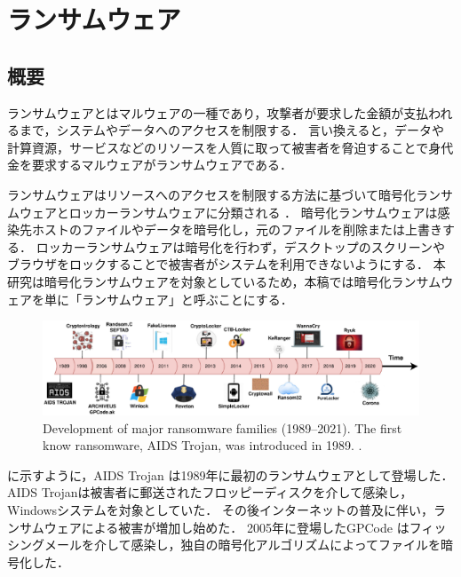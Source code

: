 \chapter{ランサムウェア}





\section{概要}
\label{sec:ransom-overview}
ランサムウェアとはマルウェアの一種であり，攻撃者が要求した金額が支払われるまで，システムやデータへのアクセスを制限する．
言い換えると，データや計算資源，サービスなどのリソースを人質に取って被害者を脅迫することで身代金を要求するマルウェアがランサムウェアである．

ランサムウェアはリソースへのアクセスを制限する方法に基づいて暗号化ランサムウェアとロッカーランサムウェアに分類される \cite{oz2022survey}．
暗号化ランサムウェアは感染先ホストのファイルやデータを暗号化し，元のファイルを削除または上書きする．
ロッカーランサムウェアは暗号化を行わず，デスクトップのスクリーンやブラウザをロックすることで被害者がシステムを利用できないようにする．
本研究は暗号化ランサムウェアを対象としているため，本稿では暗号化ランサムウェアを単に「ランサムウェア」と呼ぶことにする．

\begin{figure}[t]
  \begin{center}
    \includegraphics[width=\columnwidth]{doc/img/ransom-evolution.eps}
  \end{center}
  \caption{Development of major ransomware families (1989–2021). The first know ransomware, AIDS Trojan, was introduced in 1989. \cite{Evolution-Ransomware}.}
  \label{fig:ransom-evolution}
\end{figure}

に示すように，AIDS Trojan \cite{aids-trojan} は1989年に最初のランサムウェアとして登場した．
AIDS Trojanは被害者に郵送されたフロッピーディスクを介して感染し，Windowsシステムを対象としていた．
その後インターネットの普及に伴い，ランサムウェアによる被害が増加し始めた．
2005年に登場したGPCode \cite{PGPCoder42:online} はフィッシングメールを介して感染し，独自の暗号化アルゴリズムによってファイルを暗号化した．

